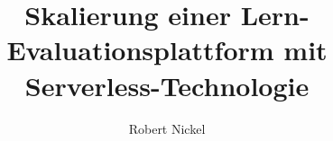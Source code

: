\documentclass[german]{htwg-report}
\begin{document}
\frontmatter



\title[Skalierung einer Lern-Evaluationsplattform mit Serverless-Technologie]{Skalierung einer Lern-Evaluationsplattform mit Serverless-Technologie}

\author{Robert Nickel}


\makecover[]
%          



\tableofcontents

\mainmatter

% 










\appendix

%

\printbibliography[heading=bibintoc]





\end{document}
